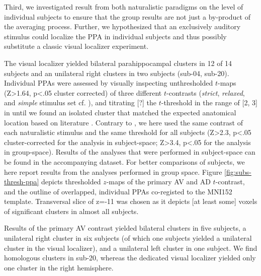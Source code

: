\documentclass[english]{article}
\begin{document}
Third, we investigated result from both naturalistic paradigms on the level of
individual subjects to ensure that the group results are not just a by-product
of the averaging process.
Further, we hypothesized that an exclusively auditory stimulus could localize
the PPA in individual subjects and thus possibly substitute a classic visual
localizer experiment.

The visual localizer \citep{sengupta2016extension} yielded bilateral
parahippocampal clusters in 12 of 14 subjects and an unilateral right clusters
in two subjects (sub-04, sub-20).
Individual PPAs were assessed by visually inspecting unthresholded $t$-maps
(Z>1.64, p<.05 cluster corrected)  of three different $t$-contrasts
(\textit{strict}, \textit{relaxed}, and \textit{simple} stimulus set cf.
\citep{sengupta2016extension}), and titrating [?] the $t$-threshold in the range
of [2, 3] in until we found an isolated cluster that matched the expected
anatomical location based on literature \citep{epstein1998ppa}.
Contrary to \citep{sengupta2016extension}, we here used the same contrast of
each naturalistic stimulus and the same threshold for all subjects (Z>2.3, p<.05
cluster-corrected for the analysis in subject-space; Z>3.4, p<.05 for the
analysis in group-space).
Results of the analyses that were performed in subject-space can be found in the
accompanying dataset.
For better comparisons of subjects, we here report results from the analyses
performed in group space.
Figure \ref{fig:subs-thresh-ppa} depicts thresholded $z$-maps of the primary AV
and AD $t$-contrast, and the outline of overlapped, individual PPAs
\citep{sengupta2016extension} co-registed to the MNI152 template.
Transversal slice of z=-11 was chosen as it depicts [at least some] voxels of
significant clusters in almost all subjects.

Results of the primary AV contrast yielded bilateral clusters in five subjects,
a unilateral right cluster in six subjects (of which one subjects yielded a
unilateral cluster in the visual localizer), and a unilateral left cluster in
one subject.
We find homologous clusters in sub-20, whereas the dedicated visual localizer
yielded only one cluster in the right hemisphere.
\end{document}
